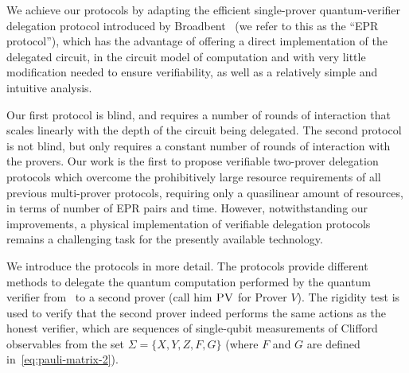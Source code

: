 \documentclass[11pt]{article}
\theoremstyle{remark}
\theoremstyle{definition}
\newcommand{\eps}{\varepsilon}
\newcommand{\pv}{\textsc{PV}}
\begin{document}
We achieve our protocols by adapting the efficient single-prover quantum-verifier delegation
protocol introduced by Broadbent~\cite{broadbent15howtoverify} (we refer to this as the ``EPR protocol''), which has the advantage of offering a direct implementation of the delegated circuit, in the circuit model of computation and with very little modification needed to ensure verifiability, as well as a relatively simple and intuitive analysis. 
 
Our first protocol is blind, and requires a number of rounds of interaction that
scales linearly with the depth of the circuit being delegated. The second
protocol is not blind, but only requires a constant number of rounds of
interaction with the provers. Our work is the first to propose verifiable two-prover delegation protocols which overcome the prohibitively large resource requirements of all previous multi-prover protocols, requiring only a quasilinear amount of resources, in terms of number of EPR pairs and time. However, notwithstanding our improvements, a physical implementation  of verifiable delegation protocols remains a challenging task for the presently available technology.
 



We introduce the protocols in more detail. The protocols provide different methods to delegate the quantum computation performed by the quantum verifier from~\cite{broadbent15howtoverify} to a second prover (call him $\pv$ for Prover $V$). The rigidity test is used to verify that the second prover indeed performs the same actions as the honest verifier, which are sequences of single-qubit measurements of Clifford observables from the set $\Sigma = \{X,Y,Z,F,G\}$ (where $F$ and $G$ are defined in~\eqref{eq:pauli-matrix-2}).
\end{document}
